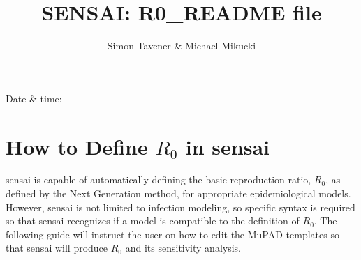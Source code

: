 \documentclass[12pt]{article}
\begin{document}
\title{SENSAI: R0\_README file}
\author{Simon Tavener \& Michael Mikucki}
\maketitle
\hfill Date \& time: \timestamp

\pagestyle{empty}

\section{How to Define $R_0$ in {\sc sensai}}

{\sc sensai} is capable of automatically defining the basic reproduction ratio, $R_0$, as defined by the Next Generation method, for appropriate epidemiological models.  However, {\sc sensai} is not limited to infection modeling, so specific syntax is required so that {\sc sensai} recognizes if a model is compatible to the definition of $R_0$.  The following guide will instruct the user on how to edit the MuPAD templates so that {\sc sensai} will produce $R_0$ and its sensitivity analysis.
\end{document}
